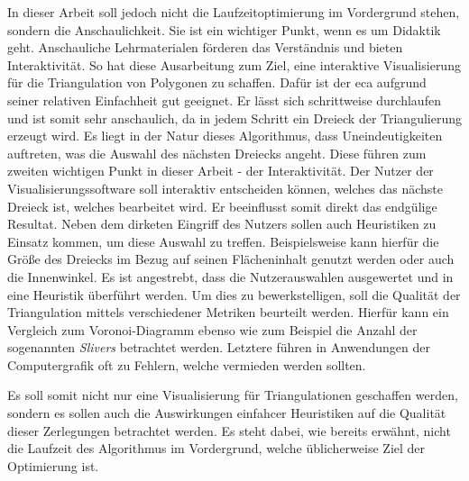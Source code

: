 In dieser Arbeit soll jedoch nicht die Laufzeitoptimierung im Vordergrund stehen, sondern die Anschaulichkeit. Sie ist ein wichtiger Punkt, wenn es um Didaktik geht.
Anschauliche Lehrmaterialen förderen das Verständnis und bieten Interaktivität. So hat diese Ausarbeitung zum Ziel, eine interaktive Visualisierung für die Triangulation von Polygonen zu schaffen.
Dafür ist der \ac{eca} aufgrund seiner relativen Einfachheit gut geeignet. Er lässt sich schrittweise durchlaufen und ist somit sehr anschaulich, da in jedem Schritt ein 
Dreieck der Triangulierung erzeugt wird. Es liegt in der Natur dieses Algorithmus, dass Uneindeutigkeiten auftreten, was die Auswahl des nächsten Dreiecks angeht. Diese 
führen zum zweiten wichtigen Punkt in dieser Arbeit - der Interaktivität. Der Nutzer der Visualisierungssoftware soll interaktiv entscheiden können, welches das nächste 
Dreieck ist, welches bearbeitet wird. Er beeinflusst somit direkt das endgülige Resultat. Neben dem dirketen Eingriff des Nutzers sollen auch Heuristiken zu Einsatz kommen, 
um diese Auswahl zu treffen. Beispielsweise kann hierfür die Größe des Dreiecks im Bezug auf seinen Flächeninhalt genutzt werden oder auch die Innenwinkel. 
Es ist angestrebt, dass die Nutzerauswahlen ausgewertet und in eine Heuristik überführt werden. Um dies zu bewerkstelligen, soll die Qualität der Triangulation mittels verschiedener 
Metriken beurteilt werden. Hierfür kann ein Vergleich zum Voronoi-Diagramm ebenso wie zum Beispiel die Anzahl der sogenannten \emph{Slivers}\cite{sliver} betrachtet werden. 
Letztere führen in Anwendungen der Computergrafik oft zu Fehlern, welche vermieden werden sollten.

Es soll somit nicht nur eine Visualisierung für Triangulationen geschaffen werden, sondern es sollen auch die Auswirkungen einfahcer Heuristiken auf die Qualität 
dieser Zerlegungen betrachtet werden. Es steht dabei, wie bereits erwähnt, nicht die Laufzeit des Algorithmus im Vordergrund, welche üblicherweise Ziel der Optimierung ist.

